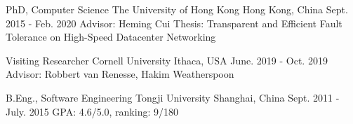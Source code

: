 

\begin{cventries}


\cventry
{PhD, Computer Science} %
{The University of Hong Kong} %
{Hong Kong, China} %
{Sept. 2015 - Feb. 2020} %
{ %
Advisor: Heming Cui\newline
Thesis: Transparent and Efficient Fault Tolerance on High-Speed Datacenter Networking
}


\cventry
{Visiting Researcher} %
{Cornell University} %
{Ithaca, USA} %
{June. 2019 - Oct. 2019} %
{ %
Advisor: Robbert van Renesse, Hakim Weatherspoon
}


\cventry
{B.Eng., Software Engineering} %
{Tongji University} %
{Shanghai, China} %
{Sept. 2011 - July. 2015} %
{ %
GPA: 4.6/5.0, ranking: 9/180
}

\end{cventries}